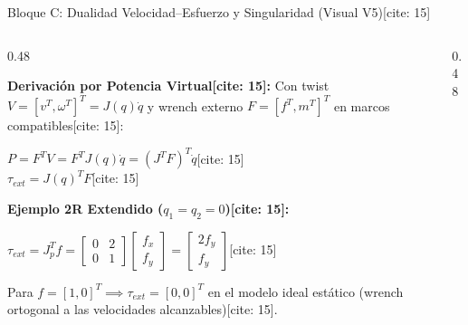 \documentclass[aspectratio=169, xcolor={table,xcdraw}]{beamer}
\begin{document}
\begin{frame}{Bloque C: Dualidad Velocidad–Esfuerzo y Singularidad (Visual V5)[cite: 15]}
    \begin{columns}[T]
        \begin{column}{0.48\textwidth}
            \scriptsize\raggedright
            \textbf{Derivación por Potencia Virtual[cite: 15]:}
            Con twist $V = [v^T, \omega^T]^T = J(q)\dot{q}$ y wrench externo $F = [f^T, m^T]^T$ en marcos compatibles[cite: 15]:
            \begin{center}
                $P = F^T V = F^T J(q)\dot{q} = (J^T F)^T \dot{q}$[cite: 15] \\[3pt]
                $\boxed{ \tau_{ext} = J(q)^T F }$[cite: 15]
            \end{center}
            \textbf{Ejemplo 2R Extendido ($q_1=q_2=0$)[cite: 15]:}
            \begin{center}
                $\tau_{ext} = J_p^T f = \begin{bmatrix} 0 & 2 \\ 0 & 1 \end{bmatrix}\begin{bmatrix} f_x \\ f_y \end{bmatrix} = \begin{bmatrix} 2f_y \\ f_y \end{bmatrix}$[cite: 15]
            \end{center}
            Para $f=[1,0]^T \implies \tau_{ext}=[0,0]^T$ en el modelo ideal estático (wrench ortogonal a las velocidades alcanzables)[cite: 15].
        \end{column}
        \begin{column}{0.48\textwidth}
            \centering
\end{column}
\end{columns}
\end{frame}
\end{document}
